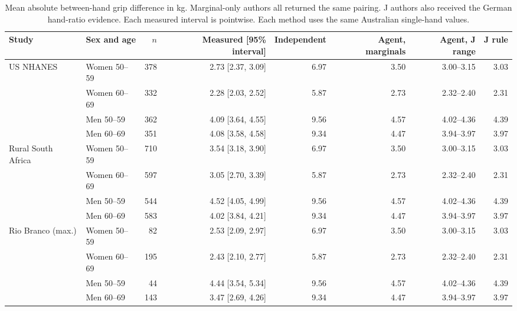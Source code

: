 \begin{table}[t]
\caption{Mean absolute between-hand grip difference in kg. Marginal-only authors all returned the same pairing. J authors also received the German hand-ratio evidence. Each measured interval is pointwise. Each method uses the same Australian single-hand values.}
\label{tab:gripgroups}
\small\centering
\begin{tabular}{@{}llrrrrrr@{}}
\toprule
Study & Sex and age & $n$ & Measured [95\% interval] & Independent & Agent, marginals & Agent, J range & J rule\\
\midrule
US NHANES & Women 50--59 & 378 & 2.73 [2.37, 3.09] & 6.97 & 3.50 & 3.00--3.15 & 3.03\\
 & Women 60--69 & 332 & 2.28 [2.03, 2.52] & 5.87 & 2.73 & 2.32--2.40 & 2.31\\
 & Men 50--59 & 362 & 4.09 [3.64, 4.55] & 9.56 & 4.57 & 4.02--4.36 & 4.39\\
 & Men 60--69 & 351 & 4.08 [3.58, 4.58] & 9.34 & 4.47 & 3.94--3.97 & 3.97\\
\addlinespace
Rural South Africa & Women 50--59 & 710 & 3.54 [3.18, 3.90] & 6.97 & 3.50 & 3.00--3.15 & 3.03\\
 & Women 60--69 & 597 & 3.05 [2.70, 3.39] & 5.87 & 2.73 & 2.32--2.40 & 2.31\\
 & Men 50--59 & 544 & 4.52 [4.05, 4.99] & 9.56 & 4.57 & 4.02--4.36 & 4.39\\
 & Men 60--69 & 583 & 4.02 [3.84, 4.21] & 9.34 & 4.47 & 3.94--3.97 & 3.97\\
\addlinespace
Rio Branco (max.) & Women 50--59 & 82 & 2.53 [2.09, 2.97] & 6.97 & 3.50 & 3.00--3.15 & 3.03\\
 & Women 60--69 & 195 & 2.43 [2.10, 2.77] & 5.87 & 2.73 & 2.32--2.40 & 2.31\\
 & Men 50--59 & 44 & 4.44 [3.54, 5.34] & 9.56 & 4.57 & 4.02--4.36 & 4.39\\
 & Men 60--69 & 143 & 3.47 [2.69, 4.26] & 9.34 & 4.47 & 3.94--3.97 & 3.97\\
\bottomrule
\end{tabular}
\end{table}
